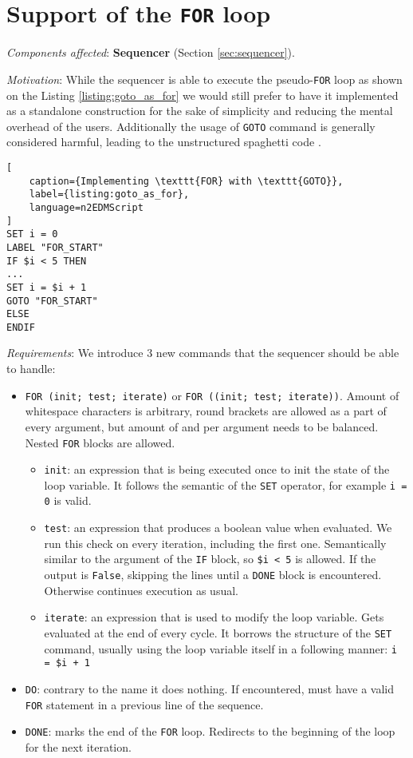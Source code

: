 \section{Support of the \texttt{FOR} loop}
\label{sec:for_loop}

\textit{Components affected}: \textbf{Sequencer} (Section \ref{sec:sequencer}).

\textit{Motivation}: While the sequencer is able to execute the pseudo-\texttt{FOR} loop as shown on the Listing \ref{listing:goto_as_for} we would still prefer to have it implemented as a standalone construction for the sake of simplicity and reducing the mental overhead of the users. Additionally the usage of \texttt{GOTO} command is generally considered \cite{Dijkstra1968} harmful, leading to the unstructured spaghetti code \cite{Cram2005}.

\begin{lstlisting}[
	caption={Implementing \texttt{FOR} with \texttt{GOTO}}, 
	label={listing:goto_as_for}, 
	language=n2EDMScript
]
SET i = 0
LABEL "FOR_START"
IF $i < 5 THEN
...
SET i = $i + 1
GOTO "FOR_START"
ELSE
ENDIF
\end{lstlisting}

\textit{Requirements}: We introduce 3 new commands that the sequencer should be able to handle:

\begin{itemize}
	\item \texttt{FOR (init; test; iterate)} or \texttt{FOR ((init; test; iterate))}. Amount of whitespace characters is arbitrary, round brackets are allowed as a part of every argument, but amount of \highlight{(} and \highlight{)} per argument needs to be balanced. Nested \texttt{FOR} blocks are allowed.
	\begin{itemize}
		\item \texttt{init}: an expression that is being executed once to init the state of the loop variable. It follows the semantic of the \texttt{SET} operator, for example \texttt{i = 0} is valid.
		\item \texttt{test}: an expression that produces a boolean value when evaluated. We run this check on every iteration, including the first one. Semantically similar to the argument of the \texttt{IF} block, so \texttt{\$i < 5} is allowed. If the output is \texttt{False}, skipping the lines until a \texttt{DONE} block is encountered. Otherwise continues execution as usual.
		\item \texttt{iterate}: an expression that is used to modify the loop variable. Gets evaluated at the end of every cycle. It borrows the structure of the \texttt{SET} command, usually using the loop variable itself in a following manner: \texttt{i = \$i + 1}
	\end{itemize}
	\item \texttt{DO}: contrary to the name it does nothing. If encountered, must have a valid \texttt{FOR} statement in a previous line of the sequence.
	\item \texttt{DONE}: marks the end of the \texttt{FOR} loop. Redirects to the beginning of the loop for the next iteration.
\end{itemize}

